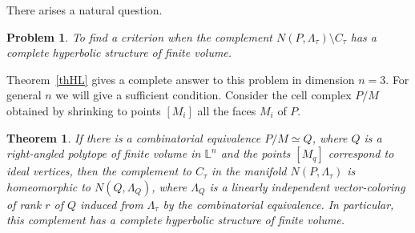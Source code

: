 \documentclass[12pt]{amsart}
\newtheorem{theorem}[formula]{Theorem}
\newtheorem{problem}{Problem}
\theoremstyle{definition}
\theoremstyle{remark}
\begin{document}
There arises a natural question.
\begin{problem}
To find a criterion when the complement $N(P,\Lambda_\tau)\setminus C_\tau$
has a complete hyperbolic structure of finite volume.
\end{problem}
Theorem~\ref{thHL} gives a complete answer to this problem in dimension $n=3$. For general $n$ we will give a sufficient condition. Consider the cell complex $P/M$ obtained by shrinking to points $[M_i]$ all the faces $M_i$ of $P$.
\begin{theorem}
If there is a combinatorial equivalence $P/M\simeq Q$, where $Q$ is a right-angled polytope 
of finite volume in $\mathbb L^n$ and the points $[M_q]$ correspond to ideal vertices, then the complement to $C_\tau$ in the manifold 
$N(P,\Lambda_\tau)$ is homeomorphic to $N(Q,\Lambda_Q)$, where $\Lambda_Q$ is a linearly independent vector-coloring
of rank $r$ of $Q$ induced from $\Lambda_\tau$  by the combinatorial equivalence.  In particular, this complement has a complete hyperbolic structure of finite volume.  
\end{theorem}
\end{document}
